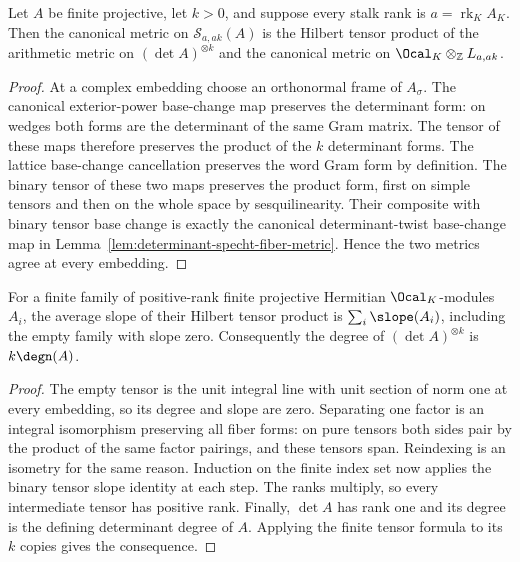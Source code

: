 \begin{lemma}
\label{lem:determinant-specht-tensor-metric}
\leanok
Let $A$ be finite projective, let $k>0$, and suppose every stalk rank
is $a=\operatorname{rk}_K A_K$. Then the canonical metric on
$\mathcal S_{a,ak}(A)$ is the Hilbert tensor product of the arithmetic
metric on $(\det A)^{\otimes k}$ and the canonical metric on
$\Ocal_K\otimes_{\mathbb Z}L_{a,ak}$.
\end{lemma}
\begin{proof}
At a complex embedding choose an orthonormal frame of $A_\sigma$.
The canonical exterior-power base-change map preserves the determinant
form: on wedges both forms are the determinant of the same Gram matrix.
The tensor of these maps therefore preserves the product of the
$k$ determinant forms. The lattice base-change cancellation preserves
the word Gram form by definition. The binary tensor of these two maps
preserves the product form, first on simple tensors and then on the
whole space by sesquilinearity. Their composite with binary tensor
base change is exactly the canonical determinant-twist base-change
map in Lemma~\ref{lem:determinant-specht-fiber-metric}. Hence the two
metrics agree at every embedding.
\end{proof}

\begin{lemma}
\label{lem:finite-tensor-average-slope}
\leanok
For a finite family of positive-rank finite projective Hermitian
$\Ocal_K$-modules $A_i$, the average slope of their Hilbert tensor
product is $\sum_i\slope(A_i)$, including the empty family with slope
zero. Consequently the degree of $(\det A)^{\otimes k}$ is
$k\degn(A)$.
\end{lemma}
\begin{proof}
The empty tensor is the unit integral line with unit section of norm
one at every embedding, so its degree and slope are zero. Separating
one factor is an integral isomorphism preserving all fiber forms:
on pure tensors both sides pair by the product of the same factor
pairings, and these tensors span. Reindexing is an isometry for the
same reason. Induction on the finite index set now applies the binary
tensor slope identity at each step. The ranks multiply, so every
intermediate tensor has positive rank. Finally, $\det A$ has rank one
and its degree is the defining determinant degree of $A$. Applying
the finite tensor formula to its $k$ copies gives the consequence.
\end{proof}

